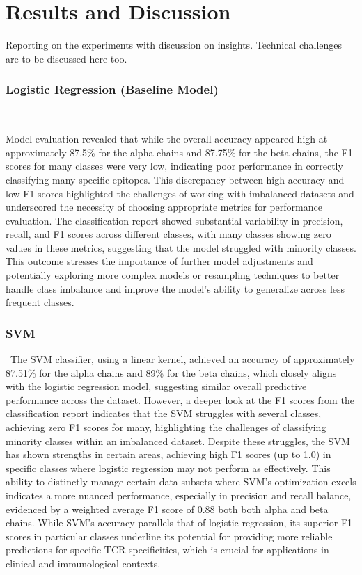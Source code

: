 \documentclass[conference]{IEEEtran}
\begin{document}
	
	
	\section{Results and Discussion}
	{\color{blue}Reporting on the experiments with discussion on insights. Technical challenges are to be discussed here too.}

    \subsubsection{Logistic Regression (Baseline Model)} \

    Model evaluation revealed that while the overall accuracy appeared high at approximately 87.5\% for the alpha chains and 87.75\% for the beta chains, the F1 scores for many classes were very low, indicating poor performance in correctly classifying many specific epitopes. This discrepancy between high accuracy and low F1 scores highlighted the challenges of working with imbalanced datasets and underscored the necessity of choosing appropriate metrics for performance evaluation. The classification report showed substantial variability in precision, recall, and F1 scores across different classes, with many classes showing zero values in these metrics, suggesting that the model struggled with minority classes. This outcome stresses the importance of further model adjustments and potentially exploring more complex models or resampling techniques to better handle class imbalance and improve the model's ability to generalize across less frequent classes.
    \\
	
	\subsubsection{SVM} \
	The SVM classifier, using a linear kernel, achieved an accuracy of approximately 87.51\% for the alpha chains and 89\% for the beta chains, which closely aligns with the logistic regression model, suggesting similar overall predictive performance across the dataset. However, a deeper look at the F1 scores from the classification report indicates that the SVM struggles with several classes, achieving zero F1 scores for many, highlighting the challenges of classifying minority classes within an imbalanced dataset. Despite these struggles, the SVM has shown strengths in certain areas, achieving high F1 scores (up to 1.0) in specific classes where logistic regression may not perform as effectively. This ability to distinctly manage certain data subsets where SVM's optimization excels indicates a more nuanced performance, especially in precision and recall balance, evidenced by a weighted average F1 score of 0.88 both both alpha and beta chains. While SVM's accuracy parallels that of logistic regression, its superior F1 scores in particular classes underline its potential for providing more reliable predictions for specific TCR specificities, which is crucial for applications in clinical and immunological contexts.
    \\
\end{document}
